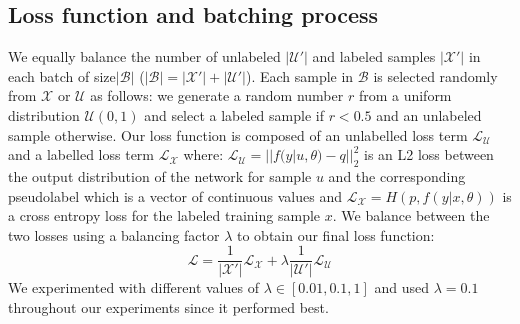 \documentclass{article}
\begin{document}
\subsection{Loss function and batching process}
We equally balance the number of unlabeled $|\mathcal{U}'|$ and labeled samples $|\mathcal{X}'|$ in each batch of size$|\mathcal{B}|$ ($|\mathcal{B}| = |\mathcal{X'}| + |\mathcal{U'}|$). Each sample in $\mathcal{B}$ is selected randomly from $\mathcal{X}$ or $\mathcal{U}$ as follows: we generate a random number $r$ from a uniform distribution $\mathcal{U}(0, 1)$ and select a labeled sample if $r<0.5$ and an unlabeled sample otherwise.
\newline
Our loss function is composed of an unlabelled loss term $\mathcal{L}_{\mathcal{U}}$ and a labelled loss term $\mathcal{L}_{\mathcal{X}}$ where:
$\mathcal{L}_{\mathcal{U}} = ||f(y | u, \theta) -  q||_{2}^{2}$
is an L2 loss between the output distribution of the network for sample $u$ and the corresponding pseudolabel which is a vector of continuous values and $\mathcal{L}_{\mathcal{X}} = H(p, f(y | x, \theta))$ is a cross entropy loss for the labeled training sample $x$. 
\newline 
We balance between the two losses using a balancing factor $\lambda$ to obtain our final loss function:
$$\mathcal{L} = \frac{1}{|\mathcal{X}'|} \mathcal{L}_{\mathcal{X}} + \lambda\frac{1}{|\mathcal{U}'|} \mathcal{L}_{\mathcal{U}}$$ We experimented with different values of $\lambda \in [0.01, 0.1, 1]$ and used $\lambda=0.1$ throughout our experiments since it performed best.
\end{document}

